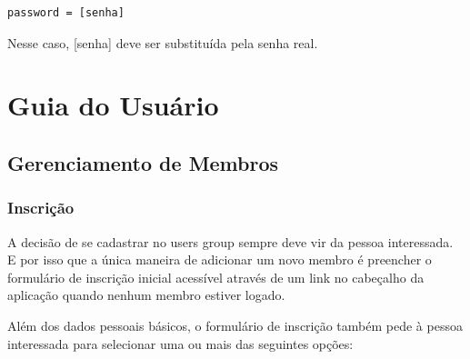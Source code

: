\documentclass[envcountsame,envcountchap]{svmono}
\begin{document}
\begin{verbatim}
password = [senha]
\end{verbatim}

Nesse caso, [senha] deve ser substituída pela senha real.

\part{Guia do Usuário}

\chapter{Gerenciamento de Membros}

\section{Inscrição}

A decisão de se cadastrar no users group sempre deve vir da pessoa interessada. E por isso que a única maneira de adicionar um novo membro é preencher o formulário de inscrição inicial acessível através de um link no cabeçalho da aplicação quando nenhum membro estiver logado.

Além dos dados pessoais básicos, o formulário de inscrição também pede à pessoa interessada para selecionar uma ou mais das seguintes opções:
\end{document}
